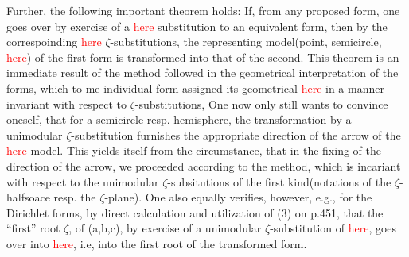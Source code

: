 Further, the following important theorem holds: If, from any proposed form, one goes over by exercise of a \textcolor{red}{here} substitution to an equivalent form, then by the correspoinding \textcolor{red}{here} $\zeta$-substitutions, the representing model(point, semicircle, \textcolor{red}{here}) of the first form is transformed into that of the second. This theorem is an immediate result of the method followed in the geometrical interpretation of the forms, which to me individual form assigned its geometrical \textcolor{red}{here} in a manner invariant with respect to $\zeta$-substitutions, One now only still wants to convince oneself, that for a semicircle resp. hemisphere, the transformation by a unimodular $\zeta$-substitution furnishes the appropriate direction of the arrow of the \textcolor{red}{here} model. This yields itself from the circumstance, that in the fixing of the direction of the arrow, we proceeded according to the method, which is incariant with respect to the unimodular $\zeta$-subsitutions of the first kind(notations of the $\zeta$-halfsoace resp. the $\zeta$-plane). One also equally verifies, however, e.g., for the Dirichlet forms, by direct calculation and utilization of (3) on p.451, that the “first” root $\zeta$, of (a,b,c), by exercise of a unimodular $\zeta$-substitution of \textcolor{red}{here}, goes over into \textcolor{red}{here}, i.e, into the first root of the transformed form.


